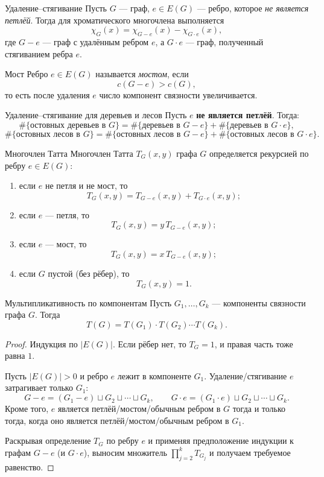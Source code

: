 \begin{Statement}{Удаление–стягивание}{}
	Пусть $G$ — граф, $e\in E(G)$ — ребро, которое \emph{не является петлёй}.
	Тогда для хроматического многочлена выполняется
	\[
	\chi_G(x)=\chi_{G-e}(x)-\chi_{G \cdot e}(x),
	\]
	где $G-e$ — граф с удалённым ребром $e$, а $G \cdot e$ — граф, полученный стягиванием ребра $e$.
\end{Statement}

\begin{Definition}{Мост}{}
	Ребро $e\in E(G)$ называется \emph{мостом}, если
	\[
	c(G-e) > c(G),
	\]
	то есть после удаления $e$ число компонент связности увеличивается.
\end{Definition}

\begin{Proposition}{Удаление–стягивание для деревьев и лесов}{}
	Пусть $e$ \textbf{не является петлёй}. Тогда:
	\[
	\#\{\text{остовных деревьев в }G\}
	=
	\#\{\text{деревьев в }G-e\}
	+
	\#\{\text{деревьев в }G\cdot e\},
	\]
	\[
	\#\{\text{остовных лесов в }G\}
	=
	\#\{\text{остовных лесов в }G-e\}
	+
	\#\{\text{остовных лесов в }G \cdot e\}.
	\]
\end{Proposition}

\begin{Definition}{Многочлен Татта}{}
	Многочлен Татта $T_G(x,y)$ графа $G$ определяется рекурсией по ребру $e\in E(G)$:
	\begin{enumerate}
		\item[(i)] если $e$ не петля и не мост, то
		\[
		T_G(x,y)=T_{G-e}(x,y)+T_{G \cdot e}(x,y);
		\]
		\item[(ii)] если $e$ — петля, то
		\[
		T_G(x,y)=y\,T_{G-e}(x,y);
		\]
		\item[(iii)] если $e$ — мост, то
		\[
		T_G(x,y)=x\,T_{G-e}(x,y);
		\]
		\item[(iv)] если $G$ пустой (без рёбер), то
		\[
		T_G(x,y)=1.
		\]
	\end{enumerate}
\end{Definition}

\begin{Lemma}{Мультипликативность по компонентам}{}
	Пусть $G_1,\dots,G_k$ — компоненты связности графа $G$.
	Тогда
	\[
	T(G)=T(G_1)\cdot T(G_2)\cdots T(G_k).
	\]
\end{Lemma}

\begin{proof}
	Индукция по $|E(G)|$.
	Если рёбер нет, то $T_G=1$, и правая часть тоже равна $1$.
	
	Пусть $|E(G)|>0$ и ребро $e$ лежит в компоненте $G_1$.
	Удаление/стягивание $e$ затрагивает только $G_1$:
	\[
	G-e=(G_1-e)\sqcup G_2\sqcup\cdots\sqcup G_k,\qquad
	G\cdot e=(G_1\cdot e)\sqcup G_2\sqcup\cdots\sqcup G_k.
	\]
	Кроме того, $e$ является петлёй/мостом/обычным ребром в $G$ тогда и только тогда, когда
	оно является петлёй/мостом/обычным ребром в $G_1$.
	
	Раскрывая определение $T_G$ по ребру $e$ и применяя предположение индукции к графам $G-e$ (и $G\cdot e$),
	выносим множитель $\prod_{j=2}^k T_{G_j}$ и получаем требуемое равенство.
\end{proof}

